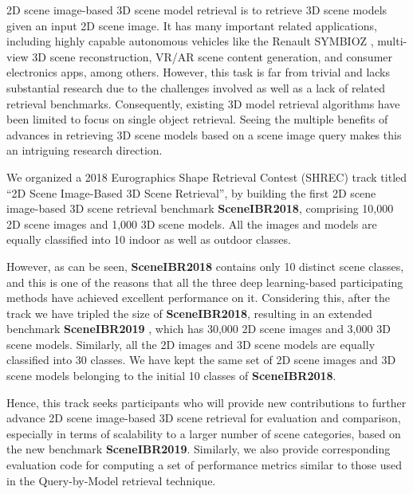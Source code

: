 \documentclass[../main.tex]{subfiles}
\begin{document}
2D scene image-based 3D scene model retrieval is to retrieve 3D scene models 
given an input 2D scene image. It has many important related applications, 
including highly capable autonomous vehicles like the Renault SYMBIOZ 
\cite{Renault} \cite{Youtube}, multi-view 3D scene reconstruction, VR/AR scene 
content generation, and consumer electronics apps, among others. However, this 
task is far from trivial and lacks substantial research due to the challenges 
involved as well as a lack of related retrieval benchmarks. Consequently, 
existing 3D model retrieval algorithms have been limited to focus on single 
object retrieval. Seeing the multiple benefits of advances in retrieving 3D scene models 
based on a scene image query makes this an intriguing research direction.

We organized a 2018 Eurographics Shape Retrieval Contest (SHREC) track \cite{SceneIBR18Website} \cite{SceneIBR18Journal} titled “2D Scene Image-Based 3D Scene Retrieval”, by building the first 2D scene image-based 3D scene retrieval benchmark \textbf{SceneIBR2018}, comprising 10,000 2D scene images and 1,000 3D scene models. All the images and models are equally classified into 10 indoor as well as outdoor classes.

However, as can be seen, \textbf{SceneIBR2018} contains only 10 distinct scene classes, and this is one of the reasons that all the three deep learning-based participating methods have achieved excellent performance on it. Considering this, after the track we have tripled the size of \textbf{SceneIBR2018}, resulting in an extended benchmark \textbf{SceneIBR2019} \cite{MIPR}, which has 30,000 2D scene images and 3,000 3D scene models. Similarly, all the 2D images and 3D scene models are equally classified into 30 classes. We have kept the same set of 2D scene images and 3D scene models belonging to the initial 10 classes of \textbf{SceneIBR2018}.

Hence, this track seeks participants who will provide new contributions to further advance 2D scene image-based 3D scene retrieval for evaluation and comparison, especially in terms of scalability to a larger number of scene categories, based on the new benchmark \textbf{SceneIBR2019}. Similarly, we also provide corresponding evaluation code for computing a set of performance metrics similar to those used in the Query-by-Model retrieval technique.
\end{document}
